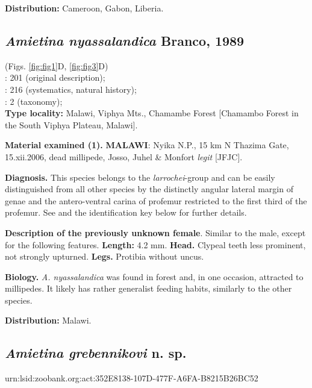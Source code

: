 \documentclass[fleqn,10pt,lineno]{wlpeerj}
\begin{document}
\textbf{Distribution:} Cameroon, Gabon, Liberia.




\subsection*{\textbf{\textit{Amietina nyassalandica} Branco, 1989}}
(Figs. \ref{fig:fig1}D, \ref{fig:fig3}D)\\
\cite{branco1989deux}: 201 (original description);\\
\cite{davis2008african}: 216 (systematics, natural history);\\
\cite{josso2008unidentis}: 2 (taxonomy);\\

\textbf{Type locality:} Malawi, Viphya Mts., Chamambe Forest [Chamambo Forest in the South Viphya Plateau, Malawi].

\textbf{Material examined (1\female).} \textbf{MALAWI}: Nyika N.P., 15 km N Thazima Gate, 15.xii.2006, dead millipede, Josso, Juhel \& Monfort \textit{legit} [JFJC].

\textbf{Diagnosis.} This species belongs to the \textit{larrochei}-group and can be easily distinguished from all other species by the distinctly angular lateral margin of genae and the antero-ventral carina of profemur restricted to the first third of the profemur. See \cite{branco1989deux} and the identification key below for further details.

\textbf{Description of the previously unknown female}. Similar to the male, except for the following features. \textbf{Length:} 4.2 mm. \textbf{Head.} Clypeal teeth less prominent, not strongly upturned. \textbf{Legs.} Protibia without uncus.

\textbf{Biology.} \textit{A. nyassalandica} was found in forest and, in one occasion, attracted to millipedes. It likely has rather generalist feeding habits, similarly to the other species.

\textbf{Distribution:} Malawi.





\subsection*{\textbf{\textit{Amietina grebennikovi} n. sp.}}

urn:lsid:zoobank.org:act:352E8138-107D-477F-A6FA-B8215B26BC52
\end{document}
